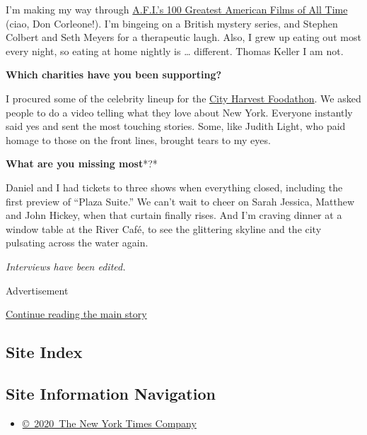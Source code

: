 I'm making my way through
\href{https://www.afi.com/afis-100-years-100-movies/}{A.F.I.'s 100
Greatest American Films of All Time} (ciao, Don Corleone!). I'm bingeing
on a British mystery series, and Stephen Colbert and Seth Meyers for a
therapeutic laugh. Also, I grew up eating out most every night, so
eating at home nightly is \ldots{} different. Thomas Keller I am not.

\textbf{Which charities have you been supporting?}

I procured some of the celebrity lineup for the
\href{https://www.cityharvest.org/foodathon/}{City Harvest Foodathon}.
We asked people to do a video telling what they love about New York.
Everyone instantly said yes and sent the most touching stories. Some,
like Judith Light, who paid homage to those on the front lines, brought
tears to my eyes.

\textbf{What are you missing most}*?*

Daniel and I had tickets to three shows when everything closed,
including the first preview of ``Plaza Suite.'' We can't wait to cheer
on Sarah Jessica, Matthew and John Hickey, when that curtain finally
rises. And I'm craving dinner at a window table at the River Café, to
see the glittering skyline and the city pulsating across the water
again.

\emph{Interviews have been edited.}

Advertisement

\protect\hyperlink{after-bottom}{Continue reading the main story}

\hypertarget{site-index}{%
\subsection{Site Index}\label{site-index}}

\hypertarget{site-information-navigation}{%
\subsection{Site Information
Navigation}\label{site-information-navigation}}

\begin{itemize}
\tightlist
\item
  \href{https://help.nytimes3xbfgragh.onion/hc/en-us/articles/115014792127-Copyright-notice}{©~2020~The
  New York Times Company}
\end{itemize}

